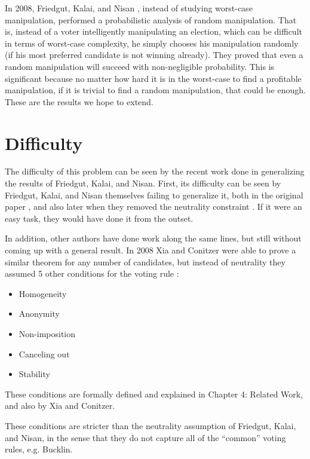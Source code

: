 	In 2008, Friedgut, Kalai, and Nisan \cite{friedgut2008elections}, instead of studying worst-case manipulation, performed a probabilistic analysis of random manipulation. That is, instead of a voter intelligently manipulating an election, which can be difficult in terms of worst-case complexity, he simply chooses his manipulation randomly (if his most preferred candidate is not winning already). They proved that even a random manipulation will succeed with non-negligible probability. This is significant because no matter how hard it is in the worst-case to find a profitable manipulation, if it is trivial to find a random manipulation, that could be enough. These are the results we hope to extend.


\section{Difficulty}

	The difficulty of this problem can be seen by the recent work done in generalizing the results of Friedgut, Kalai, and Nisan. First, its difficulty can be seen by Friedgut, Kalai, and Nisan themselves failing to generalize it, both in the original paper \cite{friedgut2008elections}, and also later when they removed the neutrality constraint \cite{friedgut2011quantitative}. If it were an easy task, they would have done it from the outset.

	In addition, other authors have done work along the same lines, but still without coming up with a general result. In 2008 Xia and Conitzer were able to prove a similar theorem for any number of candidates, but instead of neutrality they assumed 5 other conditions for the voting rule \cite{xia2008sufficient}:

	\begin{itemize}
		\item Homogeneity
		\item Anonymity
		\item Non-imposition
		\item Canceling out
		\item Stability
	\end{itemize}

	These conditions are formally defined and explained in Chapter 4: Related Work, and also by Xia and Conitzer.

	These conditions are stricter than the neutrality assumption of Friedgut, Kalai, and Nisan, in the sense that they do not capture all of the ``common'' voting rules, e.g. Bucklin.

